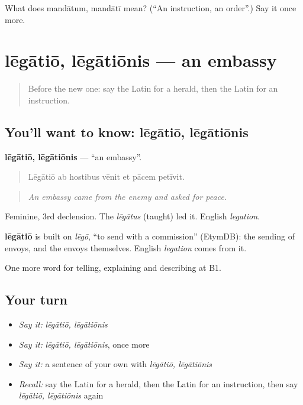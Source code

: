 \begin{tcolorbox}[breakable,colback=teal!4,colframe=teal!35!black,title={Before you move on}]
What does mandātum, mandātī mean? (\textquotedblleft{}An instruction, an order\textquotedblright{}.) Say it once more.
\end{tcolorbox}
\section[lēgātiō, lēgātiōnis]{lēgātiō, lēgātiōnis — an embassy}

\label{lesson:LA-C300-legatio}



\begin{quote}
Before the new one: say the Latin for a herald, then the Latin for an instruction.
\end{quote}

\subsection*{You'll want to know: lēgātiō, lēgātiōnis}
\textbf{lēgātiō, lēgātiōnis} — \textquotedblleft{}an embassy\textquotedblright{}.

\begin{quote}
Lēgātiō ab hostibus vēnit et pācem petīvit.
\end{quote}

\begin{quote}
\emph{An embassy came from the enemy and asked for peace.}
\end{quote}

Feminine, 3rd declension. The \emph{lēgātus} (taught) led it. English \emph{legation}.

\begin{cousinweb}
\textbf{lēgātiō} is built on \emph{lēgō}, \textquotedblleft{}to send with a commission\textquotedblright{} (EtymDB): the sending of envoys, and the envoys themselves. English \emph{legation} comes from it.
\end{cousinweb}

\begin{grammarlens}[title={What you've built}]
One more word for telling, explaining and describing at B1.
\end{grammarlens}

\subsection*{Your turn}
\begin{itemize}
\raggedright
  \item \emph{Say it:} \emph{lēgātiō, lēgātiōnis}
  \item \emph{Say it:} \emph{lēgātiō, lēgātiōnis}, once more
  \item \emph{Say it:} a sentence of your own with \emph{lēgātiō, lēgātiōnis}
  \item \emph{Recall:} say the Latin for a herald, then the Latin for an instruction, then say \emph{lēgātiō, lēgātiōnis} again
\end{itemize}

